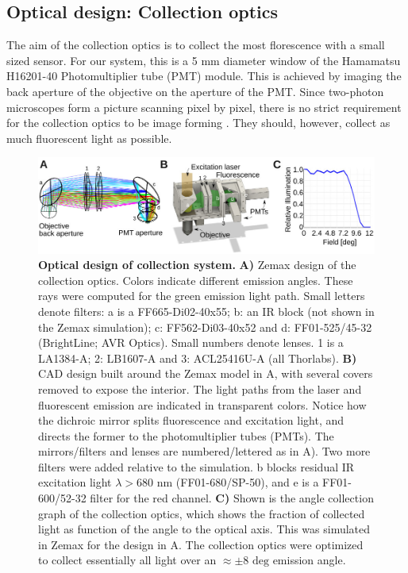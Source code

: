 \documentclass[10pt,letterpaper]{article}
\begin{document}
\subsection*{Optical design: Collection optics}
%
The aim of the collection optics is to collect the most florescence with a small sized sensor. For our system, this is a 5 mm diameter window of the Hamamatsu H16201-40 Photomultiplier tube (PMT) module. This is achieved by imaging the back aperture of the objective on the aperture of the PMT. Since two-photon microscopes form a picture scanning pixel by pixel, there is no strict requirement for the collection optics to be image forming \cite{Tsai2015}. They should, however, collect as much fluorescent light as possible.
%
\begin{figure}[!t]
    \includegraphics[width=\textwidth]{fig3.jpg}
    \caption{{\bf Optical design of collection system.} \textbf{A)} Zemax design of the collection optics. Colors indicate different emission angles. These rays were computed for the green emission light path. Small letters denote filters: a is a FF665-Di02-40x55; b: an IR block (not shown in the Zemax simulation); c: FF562-Di03-40x52 and d: FF01-525/45-32 (BrightLine; AVR Optics). Small numbers  denote lenses. 1 is a LA1384-A; 2: LB1607-A and 3: ACL25416U-A (all Thorlabs). \textbf{B)} CAD design built around the Zemax model in A, with several covers removed to expose the interior. The light paths from the laser and fluorescent emission are indicated in transparent colors. Notice how the dichroic mirror splits fluorescence and excitation light, and directs the former to the photomultiplier tubes (PMTs). The mirrors/filters and lenses are numbered/lettered as in A). Two more filters were added relative to the simulation. b blocks residual IR excitation light $\lambda>680\text{ nm}$ (FF01-680/SP-50), and e is a FF01-600/52-32 filter for the red channel. \textbf{C)} Shown is the angle collection graph of the collection optics, which shows the fraction of collected light as function of the angle to the optical axis. This was simulated in Zemax for the design in A. The collection optics were optimized to collect essentially all light over an $\approx\pm 8\text{ deg}$ emission angle.}
    \label{fig3}
\end{figure}
\end{document}
